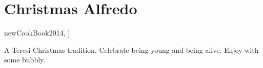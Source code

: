 \section{Christmas Alfredo}

\begin{recipestats}[
        servings=2 people,
        preptime=15 \minute,
        bakingtime=20 \minute,
        source=Mike \& Jane,
        original=\citetitle{newCookBook2014}~\cite[p.~426]{newCookBook2014},
    ]
\end{recipestats}

\begin{recipeabstract}
    A Teresi Christmas tradition.
    Celebrate being young and being alive.
    Enjoy with some bubbly.
\end{recipeabstract}

\begin{ingredientcolumns}
    \begin{ingredientblock}
        \\
        \\
        \\
    \end{ingredientblock}
    \begin{ingredientblock}
        \\
        \\
        \\
    \end{ingredientblock}
\end{ingredientcolumns}

